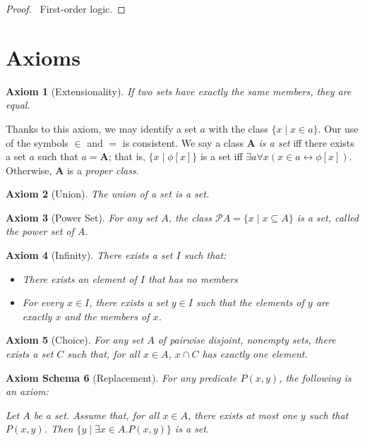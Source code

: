 \documentclass{book}
\let\qed\relax
\newtheorem{ax}{Axiom}[section]
\newtheorem{axs}[ax]{Axiom Schema}
\theoremstyle{definition}
\begin{document}
\begin{proof}
\pf\ First-order logic. \qed
\end{proof}

\section{Axioms}
	
\begin{ax}[Extensionality]
If two sets have exactly the same members, they are equal.
\end{ax}

Thanks to this axiom, we may identify a set $a$ with the class $\{x \mid x \in a\}$. Our use of the symbols $\in$ and $=$ is consistent. We say a class $\mathbf{A}$ \emph{is a set} iff there exists a set $a$ such that $a = \mathbf{A}$; that is, $\{x \mid \phi[x]\}$ is a set iff $\exists a \forall x (x \in a \leftrightarrow \phi[x])$. Otherwise, $\mathbf{A}$ is a \emph{proper class}.

\begin{ax}[Union]
The union of a set is a set.
\end{ax}

\begin{ax}[Power Set]
For any set $A$, the class $\mathcal{P} A = \{x \mid x \subseteq A\}$ is a set, called the \emph{power set} of $A$.
\end{ax}

\begin{ax}[Infinity]
There exists a set $I$ such that:
\begin{itemize}
\item There exists an element of $I$ that has no members
\item For every $x \in I$, there exists a set $y \in I$ such that the elements of $y$ are exactly $x$ and the members of $x$.
\end{itemize}
\end{ax}

\begin{ax}[Choice]
For any set $A$ of pairwise disjoint, nonempty sets, there exists a set $C$ such that, for all $x \in A$, $x \cap C$ has exactly one element.
\end{ax}

\begin{axs}[Replacement]
For any predicate $P(x,y)$, the following is an axiom:

Let $A$ be a set. Assume that, for all $x \in A$, there exists at most one $y$ such that $P(x,y)$. Then $\{y \mid \exists x \in A. P(x,y)\}$ is a set.
\end{axs}
\end{document}
